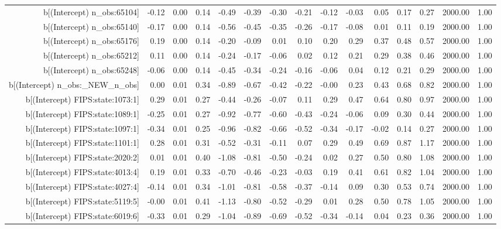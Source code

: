 \begin{table}[ht]
\begin{tabular}{rrrrrrrrrrrrrrr}
  b[(Intercept) n\_obs:65104] & -0.12 & 0.00 & 0.14 & -0.49 & -0.39 & -0.30 & -0.21 & -0.12 & -0.03 & 0.05 & 0.17 & 0.27 & 2000.00 & 1.00 \\ 
  b[(Intercept) n\_obs:65140] & -0.17 & 0.00 & 0.14 & -0.56 & -0.45 & -0.35 & -0.26 & -0.17 & -0.08 & 0.01 & 0.11 & 0.19 & 2000.00 & 1.00 \\ 
  b[(Intercept) n\_obs:65176] & 0.19 & 0.00 & 0.14 & -0.20 & -0.09 & 0.01 & 0.10 & 0.20 & 0.29 & 0.37 & 0.48 & 0.57 & 2000.00 & 1.00 \\ 
  b[(Intercept) n\_obs:65212] & 0.11 & 0.00 & 0.14 & -0.24 & -0.17 & -0.06 & 0.02 & 0.12 & 0.21 & 0.29 & 0.38 & 0.46 & 2000.00 & 1.00 \\ 
  b[(Intercept) n\_obs:65248] & -0.06 & 0.00 & 0.14 & -0.45 & -0.34 & -0.24 & -0.16 & -0.06 & 0.04 & 0.12 & 0.21 & 0.29 & 2000.00 & 1.00 \\ 
  b[(Intercept) n\_obs:\_NEW\_n\_obs] & 0.00 & 0.01 & 0.34 & -0.89 & -0.67 & -0.42 & -0.22 & -0.00 & 0.23 & 0.43 & 0.68 & 0.82 & 2000.00 & 1.00 \\ 
  b[(Intercept) FIPS:state:1073:1] & 0.29 & 0.01 & 0.27 & -0.44 & -0.26 & -0.07 & 0.11 & 0.29 & 0.47 & 0.64 & 0.80 & 0.97 & 2000.00 & 1.00 \\ 
  b[(Intercept) FIPS:state:1089:1] & -0.25 & 0.01 & 0.27 & -0.92 & -0.77 & -0.60 & -0.43 & -0.24 & -0.06 & 0.09 & 0.30 & 0.44 & 2000.00 & 1.00 \\ 
  b[(Intercept) FIPS:state:1097:1] & -0.34 & 0.01 & 0.25 & -0.96 & -0.82 & -0.66 & -0.52 & -0.34 & -0.17 & -0.02 & 0.14 & 0.27 & 2000.00 & 1.00 \\ 
  b[(Intercept) FIPS:state:1101:1] & 0.28 & 0.01 & 0.31 & -0.52 & -0.31 & -0.11 & 0.07 & 0.29 & 0.49 & 0.69 & 0.87 & 1.17 & 2000.00 & 1.00 \\ 
  b[(Intercept) FIPS:state:2020:2] & 0.01 & 0.01 & 0.40 & -1.08 & -0.81 & -0.50 & -0.24 & 0.02 & 0.27 & 0.50 & 0.80 & 1.08 & 2000.00 & 1.00 \\ 
  b[(Intercept) FIPS:state:4013:4] & 0.19 & 0.01 & 0.33 & -0.70 & -0.46 & -0.23 & -0.03 & 0.19 & 0.41 & 0.61 & 0.82 & 1.04 & 2000.00 & 1.00 \\ 
  b[(Intercept) FIPS:state:4027:4] & -0.14 & 0.01 & 0.34 & -1.01 & -0.81 & -0.58 & -0.37 & -0.14 & 0.09 & 0.30 & 0.53 & 0.74 & 2000.00 & 1.00 \\ 
  b[(Intercept) FIPS:state:5119:5] & -0.00 & 0.01 & 0.41 & -1.13 & -0.80 & -0.52 & -0.29 & 0.01 & 0.28 & 0.50 & 0.78 & 1.05 & 2000.00 & 1.00 \\ 
  b[(Intercept) FIPS:state:6019:6] & -0.33 & 0.01 & 0.29 & -1.04 & -0.89 & -0.69 & -0.52 & -0.34 & -0.14 & 0.04 & 0.23 & 0.36 & 2000.00 & 1.00 \\ 

\end{tabular}
\end{table}
